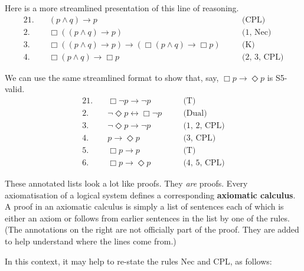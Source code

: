 Here is a more streamlined presentation of this line of reasoning.
%
\begin{alignat*}{2}
  1.\quad& (p \land q) \to p &\quad& \text{(CPL)}\\
  2.\quad& \Box((p \land q) \to p) &\quad& \text{(1, Nec)}\\
  3.\quad& \Box((p \land q) \to p) \to( \Box(p \land q) \to \Box p) &\quad& \text{(K)}\\
  4.\quad& \Box(p \land q) \to \Box p &\quad& \text{(2, 3, CPL)}
\end{alignat*}

We can use the same streamlined format to show that, say,
$\Box p \to \Diamond p$ is S5-valid.
%
\begin{alignat*}{2}
  1.\quad& \Box \neg p \to \neg p &\quad& \text{(T)}\\
  2.\quad& \neg\Diamond p \leftrightarrow \Box \neg p &\quad& \text{(Dual)}\\
  3.\quad& \neg\Diamond p \to \neg p &\quad& \text{(1, 2, CPL)}\\
  4.\quad& p \to \Diamond p &\quad& \text{(3, CPL)}\\
  5.\quad& \Box p \to p &\quad& \text{(T)}\\
  6.\quad& \Box p \to \Diamond p &\quad& \text{(4, 5, CPL)}
\end{alignat*}

These annotated lists look a lot like proofs. They \emph{are} proofs. Every
axiomatisation of a logical system defines a corresponding \textbf{axiomatic
  calculus}. A proof in an axiomatic calculus is simply a list of sentences each
of which is either an axiom or follows from earlier sentences in the list by one
of the rules. (The annotations on the right are not officially part of the proof.
They are added to help understand where the lines come from.)

In this context, it may help to re-state the rules Nec and CPL, as follows:
\begin{principles}
  \\
\end{principles}

